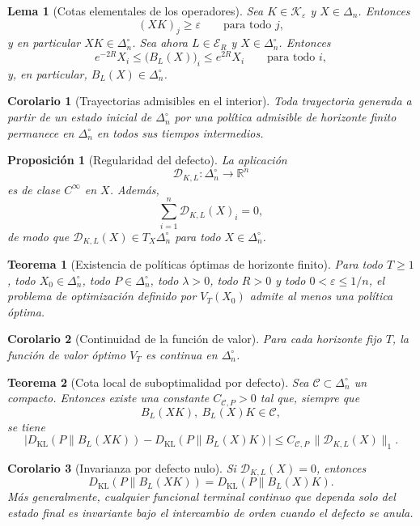 \documentclass[12pt]{article}
\newtheorem{lema}{Lema}[section]
\newtheorem{proposicion}{Proposición}[section]
\newtheorem{teorema}{Teorema}[section]
\newtheorem{corolario}{Corolario}[section]
\begin{document}
\begin{lema}[Cotas elementales de los operadores]
Sea $K\in\mathcal{K}_\varepsilon$ y $X\in\Delta_n$. Entonces
\[
(XK)_j\geq \varepsilon
\qquad\text{para todo } j,
\]
y en particular $XK\in\Delta_n^\circ$. Sea ahora $L\in\mathcal{E}_R$ y
$X\in\Delta_n^\circ$. Entonces
\[
e^{-2R}X_i\leq \bigl(B_L(X)\bigr)_i\leq e^{2R}X_i
\qquad\text{para todo } i,
\]
y, en particular, $B_L(X)\in\Delta_n^\circ$.
\end{lema}

\begin{corolario}[Trayectorias admisibles en el interior]
Toda trayectoria generada a partir de un estado inicial de $\Delta_n^\circ$ por
una política admisible de horizonte finito permanece en $\Delta_n^\circ$ en
todos sus tiempos intermedios.
\end{corolario}

\begin{proposicion}[Regularidad del defecto]
La aplicación
\[
\mathcal{D}_{K,L}:\Delta_n^\circ\longrightarrow \mathbb{R}^n
\]
es de clase $C^\infty$ en $X$. Además,
\[
\sum_{i=1}^n \mathcal{D}_{K,L}(X)_i=0,
\]
de modo que $\mathcal{D}_{K,L}(X)\in T_X\Delta_n^\circ$ para todo
$X\in\Delta_n^\circ$.
\end{proposicion}

\begin{teorema}[Existencia de políticas óptimas de horizonte finito]
Para todo $T\geq 1$, todo $X_0\in\Delta_n^\circ$, todo $P\in\Delta_n^\circ$,
todo $\lambda>0$, todo $R>0$ y todo $0<\varepsilon\leq 1/n$, el problema de
optimización definido por $V_T(X_0)$ admite al menos una política óptima.
\end{teorema}

\begin{corolario}[Continuidad de la función de valor]
Para cada horizonte fijo $T$, la función de valor óptimo $V_T$ es continua en
$\Delta_n^\circ$.
\end{corolario}

\begin{teorema}[Cota local de suboptimalidad por defecto]
Sea $\mathcal{C}\subset\Delta_n^\circ$ un compacto. Entonces existe una
constante $C_{\mathcal{C},P}>0$ tal que, siempre que
\[
B_L(XK),\ B_L(X)K\in\mathcal{C},
\]
se tiene
\[
\bigl|D_{\mathrm{KL}}(P\|B_L(XK)) - D_{\mathrm{KL}}(P\|B_L(X)K)\bigr|
\leq
C_{\mathcal{C},P}\,\|\mathcal{D}_{K,L}(X)\|_1.
\]
\end{teorema}

\begin{corolario}[Invarianza por defecto nulo]
Si $\mathcal{D}_{K,L}(X)=0$, entonces
\[
D_{\mathrm{KL}}(P\|B_L(XK))=D_{\mathrm{KL}}(P\|B_L(X)K).
\]
Más generalmente, cualquier funcional terminal continuo que dependa solo del
estado final es invariante bajo el intercambio de orden cuando el defecto se
anula.
\end{corolario}
\end{document}
